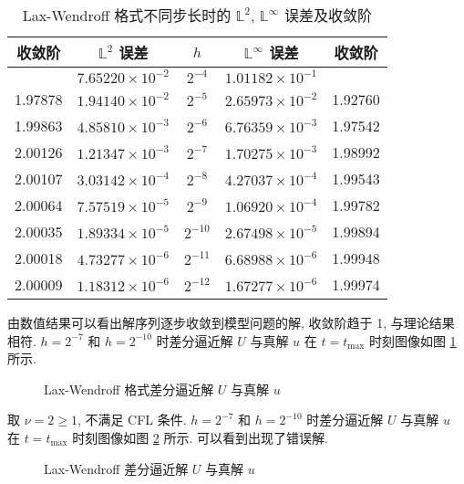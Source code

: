 \documentclass[UTF8, a4paper, 12pt, oneside, onecolumn]{article}
\begin{document}
\begin{table}[H]\centering\heiti{}
	\caption{Lax-Wendroff 格式不同步长时的 $\mathbb{L}^2$, $\mathbb{L}^\infty$ 误差及收敛阶}\label{tab:lax_wendroff_err}
	\begin{tabular}{|c|c|c|c|c|}\hline
		收敛阶	&	$\mathbb{L}^2$ 误差	&	$h$	&	$\mathbb{L}^\infty$ 误差		&	收敛阶\\\hline
				&	$7.65220 \times 10^{-2}$	&	$2^{-4}$	&	$1.01182 \times 10^{-1}$	&		   \\\hline
		1.97878	&	$1.94140 \times 10^{-2}$	&	$2^{-5}$	&	$2.65973 \times 10^{-2}$	&	1.92760\\\hline
		1.99863	&	$4.85810 \times 10^{-3}$	&	$2^{-6}$	&	$6.76359 \times 10^{-3}$	&	1.97542\\\hline
		2.00126	&	$1.21347 \times 10^{-3}$	&	$2^{-7}$	&	$1.70275 \times 10^{-3}$	&	1.98992\\\hline
		2.00107	&	$3.03142 \times 10^{-4}$	&	$2^{-8}$	&	$4.27037 \times 10^{-4}$	&	1.99543\\\hline
		2.00064	&	$7.57519 \times 10^{-5}$	&	$2^{-9}$	&	$1.06920 \times 10^{-4}$	&	1.99782\\\hline
		2.00035	&	$1.89334 \times 10^{-5}$	&	$2^{-10}$	&	$2.67498 \times 10^{-5}$	&	1.99894\\\hline
		2.00018	&	$4.73277 \times 10^{-6}$	&	$2^{-11}$	&	$6.68988 \times 10^{-6}$	&	1.99948\\\hline
		2.00009	&	$1.18312 \times 10^{-6}$	&	$2^{-12}$	&	$1.67277 \times 10^{-6}$	&	1.99974\\\hline
	\end{tabular}
\end{table}

由数值结果可以看出解序列逐步收敛到模型问题的解, 收敛阶趋于 1, 与理论结果相符. $h = 2^{-7}$ 和 $h = 2^{-10}$ 时差分逼近解 $U$ 与真解 $u$ 在 $t = t_{\max }$ 时刻图像如图 \ref{fig:lax_wendroff_Uu} 所示.

\begin{figure}[H]\centering{}
	\resizebox{0.4\linewidth}{!}{}\quad
	\resizebox{0.4\linewidth}{!}{}
	\caption{Lax-Wendroff 格式差分逼近解 $U$ 与真解 $u$}\label{fig:lax_wendroff_Uu}
\end{figure}

取 $\nu = 2 \geq 1$, 不满足 CFL 条件. $h = 2^{-7}$ 和 $h = 2^{-10}$ 时差分逼近解 $U$ 与真解 $u$ 在 $t = t_{\max }$ 时刻图像如图 \ref{fig:lax_wendroff_Uu_noCFL} 所示. 可以看到出现了错误解.

\begin{figure}[H]\centering{}
	\resizebox{0.4\linewidth}{!}{}\quad
	\resizebox{0.4\linewidth}{!}{}
	\caption{Lax-Wendroff 差分逼近解 $U$ 与真解 $u$}\label{fig:lax_wendroff_Uu_noCFL}
\end{figure}
\end{document}
